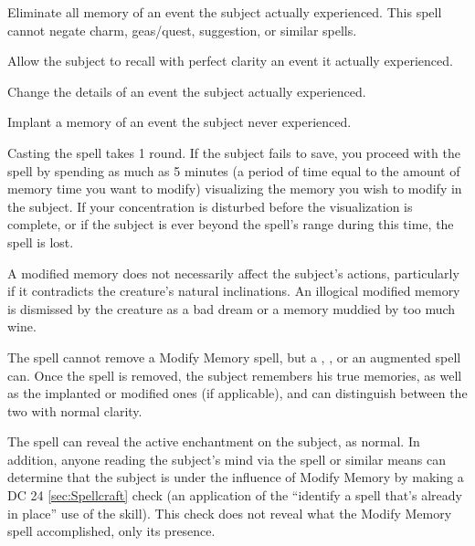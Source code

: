 \begin{list}{}{\leftmargin=1em}
 \item Eliminate all memory of an event the subject actually experienced. This spell cannot negate charm, geas/quest, suggestion, or similar spells.
 \item Allow the subject to recall with perfect clarity an event it actually experienced.
 \item Change the details of an event the subject actually experienced.
 \item Implant a memory of an event the subject never experienced.
\end{list}
Casting the spell takes 1 round. If the subject fails to save, you proceed with the spell by spending as much as 5 minutes (a period of time equal to the amount of memory time you want to modify) visualizing the memory you wish to modify in the subject. If your concentration is disturbed before the visualization is complete, or if the subject is ever beyond the spell's range during this time, the spell is lost.

A modified memory does not necessarily affect the subject's actions, particularly if it contradicts the creature's natural inclinations. An illogical modified memory is dismissed by the creature as a bad dream or a memory muddied by too much wine.

The  spell cannot remove a Modify Memory spell, but a , ,  or an augmented  spell can. Once the spell is removed, the subject remembers his true memories, as well as the implanted or modified ones (if applicable), and can distinguish between the two with normal clarity.

The  spell can reveal the active enchantment on the subject, as normal.
In addition, anyone reading the subject's mind via the  spell or similar means can determine that the subject is under the influence of Modify Memory by making a DC 24 \ref{sec:Spellcraft} check (an application of the ``identify a spell that's already in place'' use of the skill). This check does not reveal what the Modify Memory spell accomplished, only its presence.

